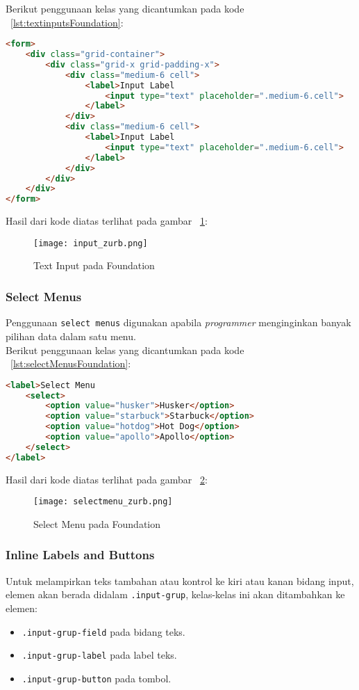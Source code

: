 \noindent Berikut penggunaan kelas yang dicantumkan pada kode ~\ref{lst:textinputsFoundation}:

\begin{lstlisting}[style=customhtml, language=HTML,  basicstyle=\ttfamily, frame=single, columns=fullflexible, keepspaces=true, breaklines=true, showstringspaces=false, label={lst:textinputsFoundation}, caption=Text inputs pada foundation 6.] 
<form>
	<div class="grid-container">
		<div class="grid-x grid-padding-x">
			<div class="medium-6 cell">
				<label>Input Label
					<input type="text" placeholder=".medium-6.cell">
				</label>
			</div>
			<div class="medium-6 cell">
				<label>Input Label
					<input type="text" placeholder=".medium-6.cell">
				</label>
			</div>
		</div>
	</div>
</form>
\end{lstlisting}
\noindent Hasil dari kode diatas terlihat pada gambar ~\ref{fig:textinputZurb}:
\begin{figure} [H]
	\centering  
	\texttt{[image: input\_zurb.png]}  
	\caption{Text Input pada Foundation}
	\label{fig:textinputZurb} 
\end{figure}

\subsubsection{Select Menus}
Penggunaan \texttt{select menus} digunakan apabila \textit{programmer} menginginkan banyak pilihan data dalam satu menu.\\
\noindent Berikut penggunaan kelas yang dicantumkan pada kode ~\ref{lst:selectMenusFoundation}:
\begin{lstlisting}[style=customhtml, language=HTML,  basicstyle=\ttfamily, frame=single, columns=fullflexible, keepspaces=true, breaklines=true, showstringspaces=false, label={lst:selectMenusFoundation}, caption=Select menus pada foundation 6.] 
<label>Select Menu
	<select>
		<option value="husker">Husker</option>
		<option value="starbuck">Starbuck</option>
		<option value="hotdog">Hot Dog</option>
		<option value="apollo">Apollo</option>
	</select>
</label>
\end{lstlisting}
\noindent Hasil dari kode diatas terlihat pada gambar ~\ref{fig:selectmenuFoundation}:
\begin{figure} [H]
	\centering  
	\texttt{[image: selectmenu\_zurb.png]}  
	\caption{Select Menu pada Foundation}
	\label{fig:selectmenuFoundation}
\end{figure}

\subsubsection{Inline Labels and Buttons}
Untuk melampirkan teks tambahan atau kontrol ke kiri atau kanan bidang input, elemen akan berada didalam \texttt{.input-grup}, kelas-kelas ini akan ditambahkan ke elemen:
\begin{itemize}
	\item \texttt{.input-grup-field} pada bidang teks.
	\item \texttt{.input-grup-label} pada label teks.
	\item \texttt{.input-grup-button} pada tombol. 
\end{itemize}

